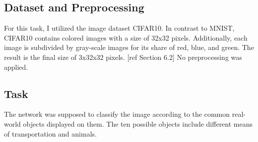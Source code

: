 \subsection*{Dataset and Preprocessing}
For this task, I utilized the image dataset CIFAR10. 
In contrast to MNIST, CIFAR10 contains colored images with a size of 32x32 pixels. Additionally, each image is subdivided by gray-scale images for its share of red, blue, and green. The result is the final size of 3x32x32 pixels. [ref Section 6.2]
No preprocessing was applied.
\subsection*{Task}
The network was supposed to classify the image according to the common real-world objects displayed on them. The ten possible objects include different means of transportation and animals. 
